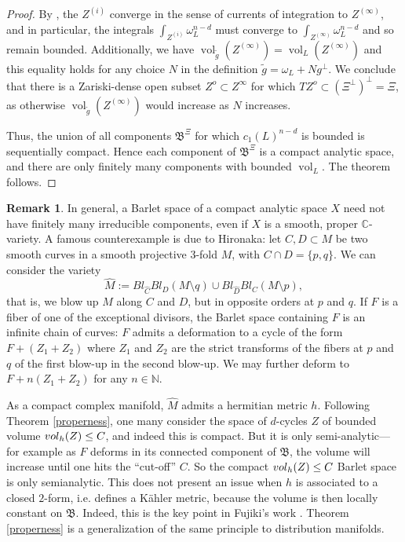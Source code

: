 \documentclass[10pt,letterpaper,english,reqno]{amsart}
\numberwithin{equation}{subsection}
\newcommand\fB{{\mathfrak B}}
\newcommand\C{{\mathbb C}}
\newcommand\N{{\mathbb N}}
\newcommand\hC{{\widehat C}}
\newcommand\hD{{\widehat D}}
\newcommand\hM{{\widehat M}}
\DeclareMathOperator{\vol}{vol}
\theoremstyle{definition}
\newtheorem{remark}[theorem]{Remark}
\begin{document}
\begin{proof}
By \cite[Prop.~2.3]{fujiki}, the $Z^{(i)}$ converge in the
sense of currents of integration to 
$Z^{(\infty)}$, and in particular, the integrals
$\int_{Z^{(i)}}\omega_L^{n-d}$ must converge
to $\int_{Z^{(\infty)}} \omega_L^{n-d}$ and so remain bounded.
Additionally, we have $\vol_{\widetilde{g}}(Z^{(\infty)})=
\vol_L(Z^{(\infty)})$ and this
equality holds for any choice $N$ in the definition
$\widetilde{g} = \omega_L+Ng^\perp$. We conclude that
there is a Zariski-dense open subset $Z^o\subset Z^{\infty}$
for which $TZ^o\subset (\Xi^{\perp})^{\perp}=\Xi$,
as otherwise $\vol_{\widetilde{g}}(Z^{(\infty)})$ would
increase as $N$ increases.

Thus, the union of all components 
$\mathfrak{B}^{\Xi}$ for which $c_1(L)^{n-d}$
is bounded is sequentially compact. Hence each component of $\mathfrak{B}^{\Xi}$  is a compact analytic space,
and there are only finitely many
components with bounded $\vol_L$. The theorem follows.
\end{proof}

\begin{remark}\label{hironaka}
In general, a Barlet space 
of a compact analytic 
space $X$ need not have finitely
many irreducible components, even if
$X$ is a smooth, proper $\C$-variety.
A famous counterexample is due to Hironaka: let
$C,D\subset M$ be two smooth curves in a smooth projective $3$-fold
$M$, with $C\cap D = \{p,q\}$. We can consider the variety
$$\hM:=Bl_{\hC} Bl_D (M\setminus q)\cup Bl_{\hD} Bl_C(M\setminus p),$$
that is, we blow up $M$ along $C$ and $D$, but in opposite orders
at $p$ and $q$. If $F$ is a fiber of one of the exceptional
divisors, the Barlet space containing $F$ is an infinite chain of curves:
$F$ admits a deformation to a cycle of the form $F+(Z_1+Z_2)$
where $Z_1$ and $Z_2$ are the strict transforms of the fibers
at $p$ and $q$ of the first blow-up in the second blow-up.
We may further deform to $F+n(Z_1+Z_2)$ 
for any $n\in \N$.

As a compact
complex manifold, $\hM$ admits
a hermitian metric $h$. Following Theorem
\ref{properness}, one many consider
the space of  
$d$-cycles $Z$ of bounded volume 
${\rm vol}_h(Z)\leq C$,
and indeed this is compact.
But it is only semi-analytic---for example
as $F$ deforms in its connected component of $\fB$, the volume
will increase until one hits the
``cut-off'' $C$. So
the compact ${\rm vol}_h(Z)\leq C$ Barlet space 
is only semianalytic.
This does not present an issue when 
$h$ is associated to a closed $2$-form,
i.e. defines a K\"ahler
metric, because the volume is then
locally constant on $\fB$. Indeed, this
is the key point in Fujiki's work
\cite[Proof of Prop.~4.1]{fujiki}.
Theorem \ref{properness} is a generalization
of the same principle to distribution manifolds.
\end{remark}
\end{document}

